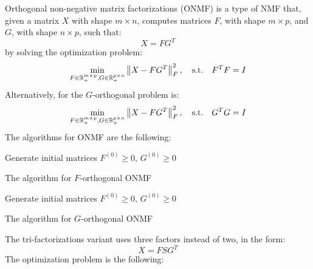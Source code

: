 Orthogonal non-negative matrix factorizations (ONMF) is a type of NMF that, given a matrix $X$ with shape $m \times n$, computes matrices $F$, with shape $m \times p$, and $G$, with shape $n \times p$, such that:
\begin{equation*}
X = FG^T
\end{equation*}
by solving the optimization problem:
\begin{equation*}
\min_{F \in \mathbb{R}^{m \times p}_+, G \in \mathbb{R}^{p \times n}_+} \left\lVert X - FG^T\right\rVert_F^2, \quad \text{s.t.} \quad F^TF = I
\end{equation*}
Alternatively, for the $G$-orthogonal problem is:
\begin{equation*}
\min_{F \in \mathbb{R}^{m \times p}_+, G \in \mathbb{R}^{p \times n}_+} \left\lVert X - FG^T\right\rVert_F^2, \quad \text{s.t.} \quad G^TG = I
\end{equation*}
The algorithms for ONMF are the following:
\vskip 0.7cm
\begin{algorithm}[H]
Generate initial matrices $F^{(0)} \geq 0$, $G^{(0)} \geq 0$\;
\caption{The algorithm for $F$-orthogonal ONMF}
\end{algorithm}
\vskip 0.7cm
\begin{algorithm}[H]
Generate initial matrices $F^{(0)} \geq 0$, $G^{(0)} \geq 0$\;
\caption{The algorithm for $G$-orthogonal ONMF}
\end{algorithm}
\vskip 0.7cm
The tri-factorizations \cite{10.1145/1150402.1150420} variant uses three factors instead of two, in the form:
\begin{equation*}
X = FSG^T
\end{equation*}
The optimization problem is the following:
